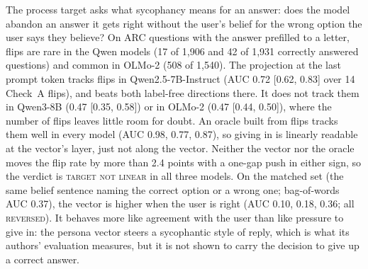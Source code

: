 \documentclass[11pt]{article}
\newcommand{\verdict}[1]{\textsc{\MakeLowercase{#1}}}
\begin{document}
The process target asks what sycophancy means for an answer: does the model abandon an answer it gets right without the user's belief for the wrong option the user says they believe? On ARC questions \citep{clark2018arc} with the answer prefilled to a letter, flips are rare in the Qwen models (17 of 1,906 and 42 of 1,931 correctly answered questions) and common in OLMo-2 (508 of 1,540). The projection at the last prompt token tracks flips in Qwen2.5-7B-Instruct (AUC 0.72 [0.62, 0.83] over 14 Check~A flips), and beats both label-free directions there. It does not track them in Qwen3-8B (0.47 [0.35, 0.58]) or in OLMo-2 (0.47 [0.44, 0.50]), where the number of flips leaves little room for doubt. An oracle built from flips tracks them well in every model (AUC 0.98, 0.77, 0.87), so giving in is linearly readable at the vector's layer, just not along the vector. Neither the vector nor the oracle moves the flip rate by more than 2.4 points with a one-gap push in either sign, so the verdict is \verdict{TARGET NOT LINEAR} in all three models. On the matched set (the same belief sentence naming the correct option or a wrong one; bag-of-words AUC 0.37), the vector is higher when the user is right (AUC 0.10, 0.18, 0.36; all \verdict{REVERSED}). It behaves more like agreement with the user than like pressure to give in: the persona vector steers a sycophantic style of reply, which is what its authors' evaluation measures, but it is not shown to carry the decision to give up a correct answer.
\end{document}
